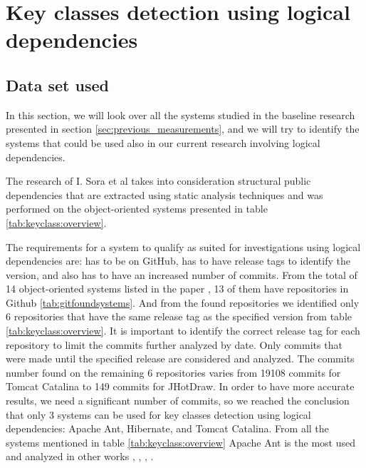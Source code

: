 \documentclass[12pt, a4paper, twoside]{report}
\begin{document}
\chapter{Key classes detection using logical dependencies}
\label{cap:usage}

\section{Data set used}
\label{sec:dataset}
In this section, we will look over all the systems studied in the baseline research presented in section \ref{sec:previous_measurements}, and we will try to identify the systems that could be used also in our current research involving logical dependencies.


The research of I. Sora et al \cite{Finding-key-classes} takes into consideration structural public dependencies that are extracted using static analysis techniques and was performed on the object-oriented systems presented in table \ref{tab:keyclass:overview}.

The requirements for a system to qualify as suited for investigations using logical dependencies are: has to be on GitHub, has to have release tags to identify the version, and also has to have an increased number of commits. 
From the total of 14 object-oriented systems listed in the paper \cite{Finding-key-classes}, 13 of them have repositories in Github \ref{tab:gitfoundsystems}. And from the found repositories we identified only 6 repositories that have the same release tag as the specified version from table \ref{tab:keyclass:overview}. It is important to identify the correct release tag for each repository to limit the commits further analyzed by date. Only commits that were made until the specified release are considered and analyzed.
The commits number found on the remaining 6 repositories varies from 19108 commits for Tomcat Catalina to 149 commits for JHotDraw. In order to have more accurate results, we need a significant number of commits, so we reached the conclusion that only 3 systems can be used for key classes detection using logical dependencies: Apache Ant, Hibernate, and Tomcat Catalina.  From all the systems mentioned in table \ref{tab:keyclass:overview} Apache Ant is the most used and analyzed in other  works \cite{enase19}, \cite{7332515}, \cite{1402122}, \cite{Kamran2016IdentificationOC}.
\end{document}
